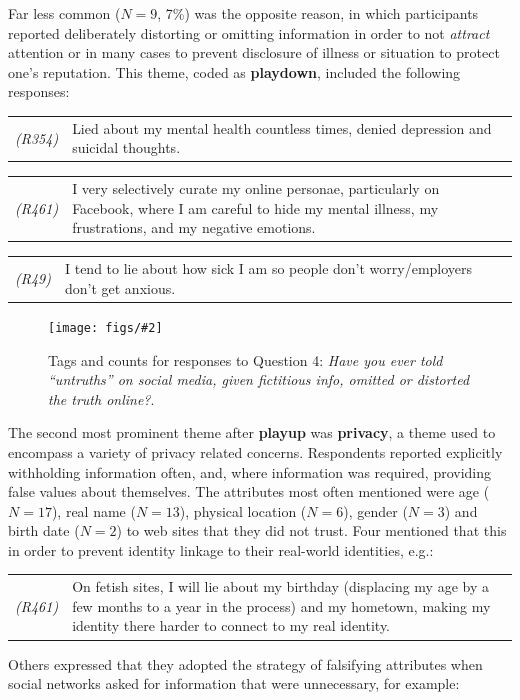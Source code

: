 \documentclass{sig-alternate}
\newcommand{\fig}[3][1.0]{
\begin{figure}[tbp]
\begin{center}
\texttt{[image: figs/\#2]}
\protect\caption{#3}
\label{fig:#2}
\end{center}
\end{figure}
}
\newcommand{\example}[2]{%

\vspace{0.10cm}

\hspace{-3.9ex} \begin{tabular}{ p{0.6cm} p{7.15cm} }
    {\it \small (R#1)} & #2 \\
\end{tabular}%
\vspace{0.10cm}

}
\begin{document}

Far less common ($N=9$, 7\%) was the opposite reason, in which participants reported deliberately distorting or omitting information in order to not \emph{attract} attention or in many cases to prevent disclosure of illness or situation to protect one's reputation.  This theme, coded as \textbf{playdown}, included the following responses:

\example{354}{Lied about my mental health countless times, denied depression and suicidal thoughts. }
\example{461}{I very selectively curate my online personae, particularly on Facebook, where I am careful to hide my mental illness, my frustrations, and my negative emotions.}
\example{49}{I tend to lie about how sick I am so people don't worry/employers don't get anxious.}



\fig{q4frequency}{Tags and counts for responses to Question 4: \emph{Have you ever told ``untruths'' on social media, given fictitious info, omitted or distorted the truth online?}.}

The second most prominent theme after \textbf{playup} was \textbf{privacy}, a theme used to encompass a variety of privacy related concerns.  Respondents reported explicitly withholding information often, and, where information was required, providing false values about themselves.  The attributes most often mentioned were age ($N=17$), real name ($N=13$), physical location ($N=6$), gender ($N=3$) and birth date ($N=2$) to web sites that they did not trust.  Four mentioned that this in order to prevent identity linkage to their real-world identities, e.g.:
\example{461}{On fetish sites, I will lie about my birthday (displacing my age by a few months to a year in the process) and my hometown, making my identity there harder to connect to my real identity.}

Others expressed that they adopted the strategy of falsifying attributes when social networks asked for information that were unnecessary, for example:
\end{document}
